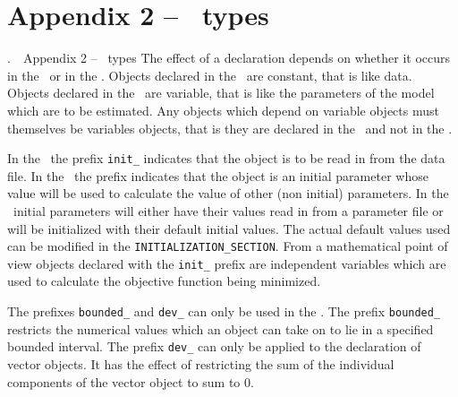 \documentclass[12pt]{book}
\makeatletter
\def\mysection#1{\section{#1}{\bigbf \medbreak\noindent\number\c@chapter.\number\c@section\ \ #1\medbreak}}
\makeatother
\begin{document}
\mysection{Appendix 2 -- \ADM\ types}
The effect of a declaration depends on whether it occurs in the
\DS\ or in the \PS. Objects declared in the \DS\ are constant,
that is like data. Objects declared in the \PS\ are variable,
that is like the parameters of the model which are to be estimated.
Any objects which depend on variable objects must themselves be
variables objects, that is they are declared in the \PS\ and
not in the \DS. 

In the \DS\ the prefix {\tt init\_} indicates
that the object is to be read in from the data file. 
In the
\PS\ the prefix indicates that the object is an initial 
parameter whose value will be used to calculate the value of other
(non initial) parameters. In the \PS\ initial parameters
will either have their values read in from a parameter
file or will be initialized 
with their default initial values. The actual 
default values used can be modified in the {\tt INITIALIZATION\_SECTION}.
From a mathematical point of view objects declared with the
{\tt init\_} prefix are independent variables which are used to
calculate the objective function being minimized.

The prefixes {\tt bounded\_} and {\tt dev\_} can only be used
in the \PS. The prefix {\tt bounded\_} restricts the numerical values
which an object can take on to lie in a specified  bounded
interval. The prefix {\tt dev\_} can only be applied to
the declaration of vector objects. It has the
effect of restricting the sum of the individual components
of the vector object to sum to 0.
 
\end{document}
